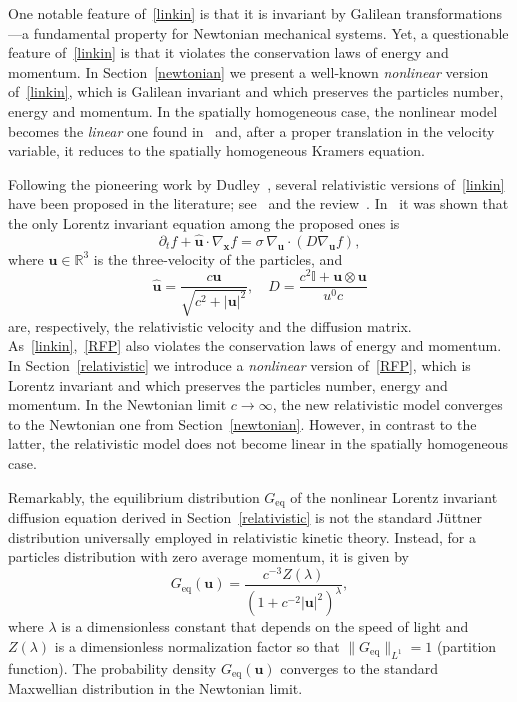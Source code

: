 \documentclass[12pt]{article}
\newcommand{\R}{\mathbb{R}}
\theoremstyle{definition}
\numberwithin{equation}{section}
\begin{document}
One notable feature of~\eqref{linkin} is that it is invariant by Galilean transformations---a fundamental property for Newtonian mechanical systems. Yet, a questionable feature of~\eqref{linkin} is that it violates the conservation laws of energy and momentum. In Section~\ref{newtonian} we present a well-known {\it nonlinear} version of~\eqref{linkin},  which is Galilean invariant and which preserves the particles number, energy and momentum. In the spatially homogeneous case, the nonlinear model becomes the {\it linear} one found in~\cite{KL} and, after a proper translation in the velocity variable, it reduces to the spatially homogeneous Kramers equation.




Following the pioneering work by Dudley~\cite{D}, several relativistic versions of~\eqref{linkin} have been proposed in the literature; see~\cite{DH, H} and the review~\cite{DH2}. In~\cite{AC} it was shown that the only Lorentz invariant equation among the proposed ones is
\begin{equation}\label{RFP}
\partial_tf+{\bm {\widehat{u}}}\cdot\nabla_{\bm x}f=\sigma\,\nabla_{\bm u}\cdot \left(D\nabla_{\bm u}f\right),
\end{equation}
where ${\bm u}\in\R^3$ is the three-velocity of the particles, and 
\[
{\bm {\widehat{u}}}=\frac{c{\bm u}}{\sqrt{c^2+|{\bm u}|^2}},\quad D=\frac{c^2\mathbb{I}+{\bm u}\otimes{\bm u}}{u^0c}
\]
are, respectively, the relativistic velocity and the diffusion matrix. As~\eqref{linkin},~\eqref{RFP} also violates the conservation laws of energy and momentum.
In Section~\ref{relativistic} we introduce a {\it nonlinear} version of~\eqref{RFP}, which is Lorentz invariant and which preserves the particles number, energy and momentum. In the Newtonian limit $c\to\infty$, the new relativistic model converges to the Newtonian one from Section~\ref{newtonian}. However, in contrast to the latter, the relativistic model does not become linear in the spatially homogeneous case. 


Remarkably, the equilibrium distribution $G_\mathrm{eq}$ of the nonlinear Lorentz invariant diffusion equation derived in Section~\ref{relativistic} is not the standard Jüttner distribution universally employed in relativistic kinetic theory. Instead, for a particles distribution with zero average momentum, it is given by
\[
G_\mathrm{eq}({\bm u})=\frac{c^{-3}Z(\lambda)}{(1+c^{-2}|{\bm u}|^2)^{\lambda}},
\]
where $\lambda$ is a dimensionless constant that depends on the speed of light and $Z(\lambda)$ is a dimensionless normalization factor so that $\|G_\mathrm{eq}\|_{L^1}=1$ (partition function).
The probability density $G_\mathrm{eq}({\bm u})$ converges to the standard Maxwellian distribution in the Newtonian limit.
\end{document}
